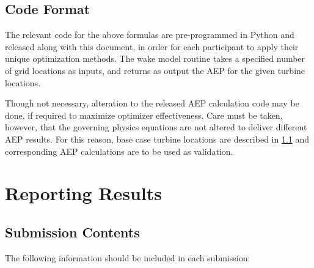 \documentclass[12pt]{article}
\begin{document}
\subsection{Code Format}
The relevant code for the above formulas are pre-programmed in Python and released along with this document, in order for each participant to apply their unique optimization methods. The wake model routine takes a specified number of grid locations as inputs, and returns as output the AEP for the given turbine locations.

Though not necessary, alteration to the released AEP calculation code may be done, if required to maximize optimizer effectiveness. Care must be taken, however, that the governing physics equations are not altered to deliver different AEP results. For this reason, base case turbine locations are described in \cref{Sec:RepResults} and corresponding AEP calculations are to be used as validation.

\section{Reporting Results}
\subsection{Submission Contents}\label{Sec:RepResults}
The following information should be included in each submission:
\end{document}
